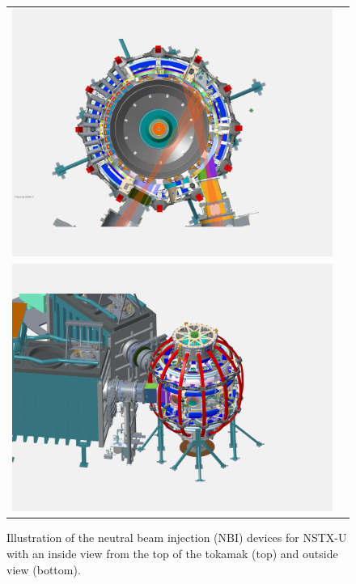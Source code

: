 \documentclass{iopart}
\begin{document}
\begin{figure}
\begin{tabular}{cc}
\includegraphics[width=\linewidth]{fig3a} \\
\includegraphics[width=\linewidth]{fig3b}
\end{tabular}
\caption{Illustration of the neutral beam injection (NBI) devices for NSTX-U with an inside view from the top of the tokamak (top) and outside view (bottom).}
\label{NBI_pics}
\end{figure}
\end{document}
